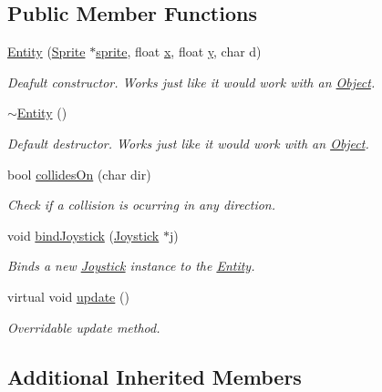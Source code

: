 \subsection*{Public Member Functions}
\begin{DoxyCompactItemize}
\item 
\hyperlink{class_entity_adb44f34990023b1802bb95c280d62de0}{Entity} (\hyperlink{class_sprite}{Sprite} $\ast$\hyperlink{class_object_ad936466f3f6b6e8fa401842c573b44e6}{sprite}, float \hyperlink{class_object_a99addca3b5d96c214fa8f90474224699}{x}, float \hyperlink{class_object_a2870044ec214e97550ee28db89c6382a}{y}, char d)
\begin{DoxyCompactList}\small\item\em Deafult constructor. Works just like it would work with an \hyperlink{class_object}{Object}. \end{DoxyCompactList}\item 
\hyperlink{class_entity_adf6d3f7cb1b2ba029b6b048a395cc8ae}{$\sim$\-Entity} ()
\begin{DoxyCompactList}\small\item\em Default destructor. Works just like it would work with an \hyperlink{class_object}{Object}. \end{DoxyCompactList}\item 
bool \hyperlink{class_entity_aac771d739c55a8bf04a40a7d65d849e4}{collides\-On} (char dir)
\begin{DoxyCompactList}\small\item\em Check if a collision is ocurring in any direction. \end{DoxyCompactList}\item 
void \hyperlink{class_entity_a97bff8e950182981a271e548f63fb6c6}{bind\-Joystick} (\hyperlink{class_joystick}{Joystick} $\ast$j)
\begin{DoxyCompactList}\small\item\em Binds a new \hyperlink{class_joystick}{Joystick} instance to the \hyperlink{class_entity}{Entity}. \end{DoxyCompactList}\item 
virtual void \hyperlink{class_entity_a00b6eeaf99b35c8f8b10b5fbfc1baf4f}{update} ()
\begin{DoxyCompactList}\small\item\em Overridable update method. \end{DoxyCompactList}\end{DoxyCompactItemize}
\subsection*{Additional Inherited Members}


